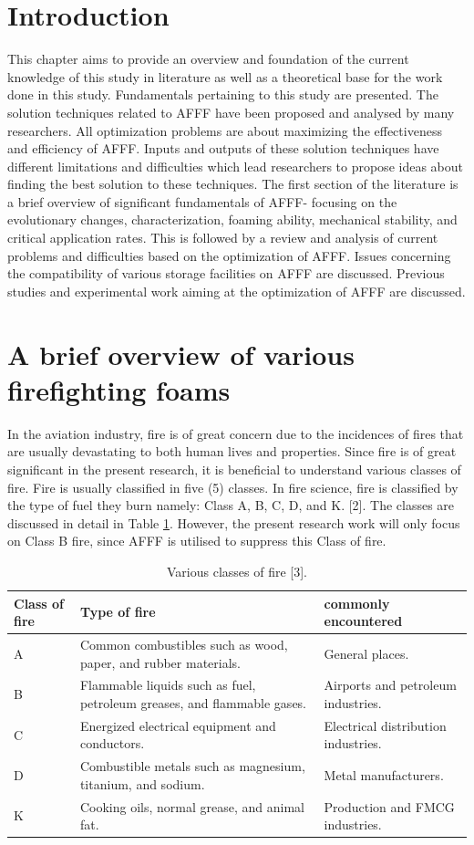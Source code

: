 \documentclass[12pt]{report}
\begin{document}
\section{Introduction}
This chapter aims to provide an overview and foundation of the current knowledge of this study in literature as well as a theoretical base for the work done in this study. Fundamentals pertaining to this study are presented. The solution techniques related to AFFF have been proposed and analysed by many researchers. All optimization problems are about maximizing the effectiveness and efficiency of AFFF. Inputs and outputs of these solution techniques have different limitations and difficulties which lead researchers to propose ideas about finding the best solution to these techniques.
The first section of the literature is a brief overview of significant fundamentals of AFFF- focusing on the evolutionary changes, characterization, foaming ability, mechanical stability, and critical application rates. This is followed by a review and analysis of current problems and difficulties based on the optimization of AFFF. Issues concerning the compatibility of various storage facilities on AFFF are discussed. Previous studies and experimental work aiming at the optimization of AFFF are discussed.

\section{A brief overview of various firefighting foams}
In the aviation industry, fire is of great concern due to the incidences of fires that are usually devastating to both human lives and properties. Since fire is of great significant in the present research, it is beneficial to understand various classes of fire. Fire is usually classified in five (5) classes. In fire science, fire is classified by the type of fuel they burn namely: Class A, B, C, D, and K. [2].  The classes are discussed in detail in Table \ref{ch2:table:classes}. However, the present research work will only focus on Class B fire, since AFFF is utilised to suppress this Class of fire.

\begin{table}[H]
\centering
\caption{Various classes of fire [3].}
\begin{tabular}{ m{} m{} m{} }
\hline
Class of fire & Type of fire & commonly encountered \\ 
\hline
A & Common combustibles such as wood, paper, and rubber materials. & General places. \\
B & Flammable liquids such as fuel, petroleum greases, and flammable gases. & Airports and petroleum industries. \\
C & Energized electrical equipment and conductors. & Electrical distribution industries. \\
D & Combustible metals such as magnesium, titanium, and sodium. & Metal manufacturers. \\ 
K & Cooking oils, normal grease, and animal fat. & Production and FMCG industries. \\
\hline
\end{tabular}
\label{ch2:table:classes}
\end{table}
\end{document}
